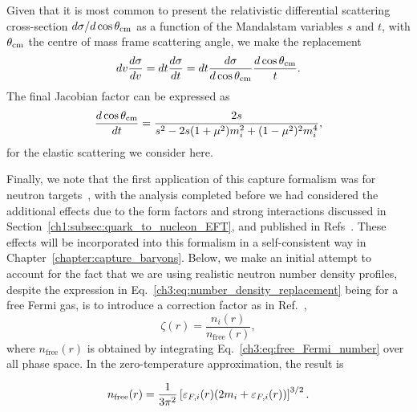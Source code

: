 Given that it is most common to present the relativistic differential scattering cross-section $d\sigma/d\cos\theta_\mathrm{cm}$ as a function of the Mandalstam variables $s$ and $t$, with $\theta_\mathrm{cm}$ the centre of mass frame scattering angle, we make the replacement
\begin{equation}
    dv \frac{d\sigma}{dv} = dt\frac{d\sigma}{dt} = dt \frac{d\sigma}{d\cos\theta_\mathrm{cm}}\frac{d\cos\theta_\mathrm{cm}}{t}.
\end{equation}
The final Jacobian factor can be expressed as
\begin{equation}
    \frac{d\cos\theta_\mathrm{cm}}{dt} = \frac{2s}{s^2 - 2 s (1 + \mu^2)m_i^2 + (1 - \mu^2)^2 m_i^4},
\end{equation}
for the elastic scattering we consider here.

Finally, we note that the first application of this capture formalism was for neutron targets~\cite{Bell:2020jou_sep_ImprovedTreatmentDark}, with the analysis completed before we had considered the additional effects due to the form factors and strong interactions discussed in Section~\ref{ch1:subsec:quark_to_nucleon_EFT}, and published in  Refs~\cite{Bell:2020obw_sep_NucleonStructureStrong, Anzuini:2021lnv_nov_Improvedtreatmentdark}. These effects will be incorporated into this formalism in a self-consistent way in Chapter~\ref{chapter:capture_baryons}. Below, we make an initial attempt to account for the fact that we are using realistic neutron number density profiles, despite the expression in Eq.~\ref{ch3:eq:number_density_replacement} being for a free Fermi gas, is to introduce a correction factor as in Ref.~\cite{Garani:2018kkd_may_NewAnalysisNeutron},
\begin{equation}
    \zeta(r) = \frac{n_i(r)}{n_\mathrm{free}(r)},
\end{equation}
where $n_\mathrm{free}(r)$ is obtained by integrating Eq.~\ref{ch3:eq:free_Fermi_number} over all phase space. In the zero-temperature approximation, the result is

\begin{equation}
    n_\mathrm{free}(r) = \frac{1}{3\pi^2}\left[ \varepsilon_{F,i}(r)(2m_i + \varepsilon_{F,i}(r))\right]^{3/2}.
    \label{ch3:eq:n_free_Fermi}
\end{equation}


